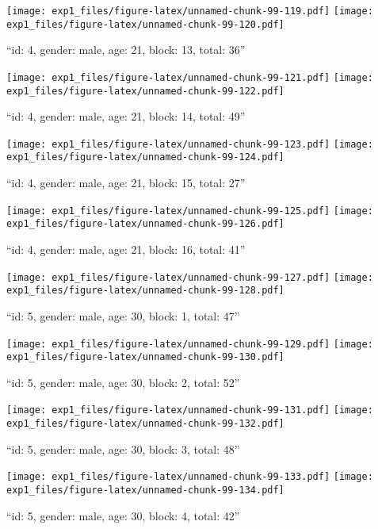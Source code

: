 \documentclass[,]{article}
\begin{document}
\texttt{[image: exp1\_files/figure-latex/unnamed-chunk-99-119.pdf]}
\texttt{[image: exp1\_files/figure-latex/unnamed-chunk-99-120.pdf]}

\newpage
[1] 

``id: 4, gender: male, age: 21, block: 13, total: 36''

\texttt{[image: exp1\_files/figure-latex/unnamed-chunk-99-121.pdf]}
\texttt{[image: exp1\_files/figure-latex/unnamed-chunk-99-122.pdf]}

\newpage
[1] 

``id: 4, gender: male, age: 21, block: 14, total: 49''

\texttt{[image: exp1\_files/figure-latex/unnamed-chunk-99-123.pdf]}
\texttt{[image: exp1\_files/figure-latex/unnamed-chunk-99-124.pdf]}

\newpage
[1] 

``id: 4, gender: male, age: 21, block: 15, total: 27''

\texttt{[image: exp1\_files/figure-latex/unnamed-chunk-99-125.pdf]}
\texttt{[image: exp1\_files/figure-latex/unnamed-chunk-99-126.pdf]}

\newpage
[1] 

``id: 4, gender: male, age: 21, block: 16, total: 41''

\texttt{[image: exp1\_files/figure-latex/unnamed-chunk-99-127.pdf]}
\texttt{[image: exp1\_files/figure-latex/unnamed-chunk-99-128.pdf]}

\newpage
[1] 

``id: 5, gender: male, age: 30, block: 1, total: 47''

\texttt{[image: exp1\_files/figure-latex/unnamed-chunk-99-129.pdf]}
\texttt{[image: exp1\_files/figure-latex/unnamed-chunk-99-130.pdf]}

\newpage
[1] 

``id: 5, gender: male, age: 30, block: 2, total: 52''

\texttt{[image: exp1\_files/figure-latex/unnamed-chunk-99-131.pdf]}
\texttt{[image: exp1\_files/figure-latex/unnamed-chunk-99-132.pdf]}

\newpage
[1] 

``id: 5, gender: male, age: 30, block: 3, total: 48''

\texttt{[image: exp1\_files/figure-latex/unnamed-chunk-99-133.pdf]}
\texttt{[image: exp1\_files/figure-latex/unnamed-chunk-99-134.pdf]}

\newpage
[1] 

``id: 5, gender: male, age: 30, block: 4, total: 42''
\end{document}
